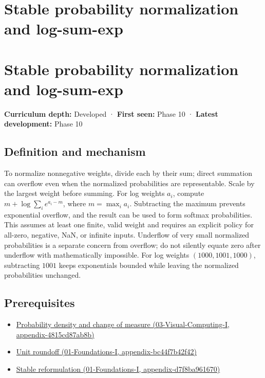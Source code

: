 \hypertarget{appendix-d580b422240f}{}
\section*{Stable probability normalization and log-sum-exp}
\section{Stable probability normalization and log-sum-exp}\label{appendix-d580b422240f-stable-probability-normalization-and-log-sum-exp}

\textbf{Curriculum depth:} Developed · \textbf{First seen:} Phase 10 · \textbf{Latest development:} Phase 10

\subsection{Definition and mechanism}\label{appendix-d580b422240f-definition-and-mechanism}

To normalize nonnegative weights, divide each by their sum; direct summation can overflow even when the normalized probabilities are representable. Scale by the largest weight before summing. For log weights \(a_i\), compute \(m+\log\sum_i e^{a_i-m}\), where \(m=\max_i a_i\). Subtracting the maximum prevents exponential overflow, and the result can be used to form softmax probabilities. This assumes at least one finite, valid weight and requires an explicit policy for all-zero, negative, NaN, or infinite inputs. Underflow of very small normalized probabilities is a separate concern from overflow; do not silently equate zero after underflow with mathematically impossible. For log weights \((1000,1001,1000)\), subtracting \(1001\) keeps exponentials bounded while leaving the normalized probabilities unchanged.

\subsection{Prerequisites}\label{appendix-d580b422240f-prerequisites}

\begin{itemize}
\tightlist
\item
  \href{../03-Visual-Computing-I/main.pdf\#nameddest=appendix-4815cd87ab8b}{Probability density and change of measure (03-Visual-Computing-I, appendix-4815cd87ab8b)}
\item
  \href{../01-Foundations-I/main.pdf\#nameddest=appendix-bc44f7b42f42}{Unit roundoff (01-Foundations-I, appendix-bc44f7b42f42)}
\item
  \href{../01-Foundations-I/main.pdf\#nameddest=appendix-d7f8ba961670}{Stable reformulation (01-Foundations-I, appendix-d7f8ba961670)}
\end{itemize}

